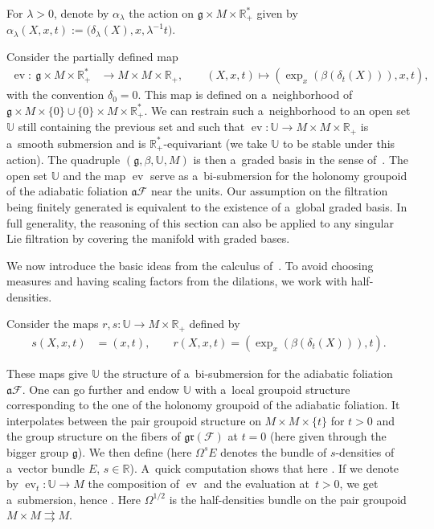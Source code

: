 \documentclass[pdftex]{sigma}
\newcommand*\diff{\mathop{}\!\mathrm{d}} %
\newcommand{\R}{\mathbb R} %
\newcommand{\CCC}{\mathscr{C}} %
\newcommand{\F}{\mathcal{F}} %
\newcommand{\g}{\mathfrak{g}} %
\newcommand{\adiab}{\mathfrak{a}} %
\newcommand{\rr}{\rightrightarrows} %
\newcommand{\hd}{\Omega^{1/2}} %
\newcommand{\ev}{\operatorname{ev}} %
\newcommand{\Fb}{\mathcal{F}} %
\newcommand{\gr}{\mathfrak{gr}} %
\newcommand{\U}{\mathbb U} %
\numberwithin{equation}{section}
\theoremstyle{definition}
\begin{document}
For $\lambda > 0$, denote by $\alpha_{\lambda}$ the action on $\g \times M \times \R_+^*$ given by $\alpha_{\lambda}(X,x,t) := \bigl(\delta_{\lambda}(X), x,\lambda^{-1}t\bigr)$.

Consider the partially defined map
\begin{align*}
 \ev \colon\ \g\times M \times \R_+^* &\to M \times M \times \R_+ ,\qquad
 (X,x,t) \mapsto (\exp_x(\beta(\delta_{t}(X))),x,t),
\end{align*}
with the convention $\delta_0 = 0$. This map is defined on a~neighborhood of $\g \times M \times \{0\} \cup \{0\} \times M \times \R_+^*$. We can restrain such a~neighborhood to an open set $\mathbb{U}$ still containing the previous set and such that $\ev \colon \mathbb{U} \to M \times M \times \R_+$ is a~smooth submersion and is $\R^*_+$-equivariant (we take $\U$ to be stable under this action). The quadruple $(\g,\beta,\mathbb{U},M)$ is then a~graded basis in the sense of~\cite{AMYMaximalHypoellipticity}. The open set $\mathbb{U}$ and the map $\ev$ serve as a~bi-submersion for the holonomy groupoid of the adiabatic foliation $\mathfrak{a}\F$ near the units. Our assumption on the filtration being finitely generated is equivalent to the existence of a~global graded basis. In full generality, the reasoning of this section can also be applied to any singular Lie filtration by covering the manifold with graded bases.

We now introduce the basic ideas from the calculus of~\cite{AMYMaximalHypoellipticity}. To avoid choosing measures and having scaling factors from the dilations, we work with half-densities.

Consider the maps $r,s \colon \U \to M\times \R_+$ defined by
\begin{align*}
 s(X,x,t) &= (x,t), \qquad
 r(X,x,t) = (\exp_x(\beta(\delta_t(X))),t).
\end{align*}

These maps give $\U$ the structure of a~bi-submersion for the adiabatic foliation $\adiab\F$. One can go further and endow $\U$ with a~local groupoid structure corresponding to the one of the holonomy groupoid of the adiabatic foliation. It interpolates between the pair groupoid structure on $M\times M \times \{t\}$ for $t>0$ and the group structure on the fibers of $\gr(\Fb)$ at $t=0$ (here given through the bigger group $\g$). We then define \smash{$\hd_{r,s} = \Omega^{1/2}\ker(\diff s) \otimes \Omega^{1/2}\ker(\diff r)$} (here $\Omega^{s} E$ denotes the bundle of $s$-densities of a~vector bundle $E$, $s\in \R$). A~quick computation shows that here \smash{$\hd_{r,s} \cong \Omega^1\g$}. If we denote by $\ev_t \colon \U \to M$ the composition of $\ev$ and the evaluation at~${t > 0}$, we get a~submersion, hence
\smash{$\ev_{t*} \colon\ \CCC^{\infty}_c\bigl(\U,\hd_{r,s}\bigr) \to \CCC^{\infty}_c\bigl(M\times M,\hd\bigr)$}.
 Here $\hd$ is the half-densities bundle on the pair groupoid $M \times M \rr M$.
\end{document}
